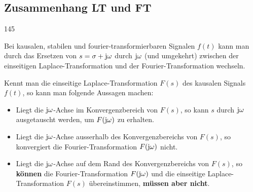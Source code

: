 \subsection{Zusammenhang LT und FT}{145}

Bei kausalen, stabilen und fourier-transformierbaren Signalen $f(t)$ kann man durch das Ersetzen von $s = \sigma + \mathrm{j} \omega$ 
durch $\mathrm{j} \omega$ (und umgekehrt) zwischen der einseitigen Laplace-Transformation und der Fourier-Transformation wechseln.

\vspace{0.2cm}

Kennt man die einseitige Laplace-Transformation $F(s)$ des kausalen Signals $f(t)$, so kann man folgende Aussagen machen:

\vspace{0.1cm}

\begin{itemize}
    \setlength\itemsep{3pt}
    \item Liegt die $\mathrm{j} \omega$-Achse im Konvergenzbereich von $F(s)$, so kann $s$ 
        durch $\mathrm{j} \omega$ ausgetauscht werden, um $F(\mathrm{j} \omega)$ zu erhalten. 
    \item Liegt die $\mathrm{j} \omega$-Achse ausserhalb des Konvergenzbereichs von 
        $F(s)$, so konvergiert die Fourier-Transformation $F(\mathrm{j} \omega)$ nicht.
    \item Liegt die $\mathrm{j} \omega$-Achse auf dem Rand des Konvergenzbereichs von
        $F(s)$, so \textbf{können} die Fourier-Transformation $F(\mathrm{j} \omega)$ und die
        einseitige Laplace-Transformation $F(s)$ übereinstimmen, \textbf{müssen aber nicht}.
\end{itemize}
